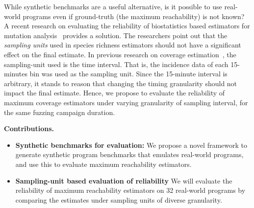 \documentclass[conference]{IEEEtran}
\begin{document}
While synthetic benchmarks are a useful alternative, is it possible to use
real-world programs even if ground-truth (the maximum reachability) is not
known? A recent research on evaluating the reliability of biostatistics based
estimators for mutation analysis~\cite{kuznetsov2024empirical} provides a
solution. The researchers point out that the \emph{sampling units} used in
species richness estimators should not have a significant effect on the final
estimate. In previous research on coverage estimation~\cite{reachability_2023},
the sampling-unit used is the time interval. That is, the incidence data of
each 15-minutes bin was used as the sampling unit. Since the 15-minute interval
is arbitrary, it stands to reason that changing the timing granularity should
not impact the final estimate. Hence, we propose to evaluate the reliability of
maximum coverage estimators under varying granularity of sampling interval,
for the same fuzzing campaign duration.



\noindent{}\textbf{Contributions.}

\begin{itemize}
  \item \textbf{Synthetic benchmarks for evaluation:} We propose a novel
framework to generate synthetic program benchmarks that emulates real-world
programs, and use this to evaluate maximum reachability estimators.

  \item \textbf{Sampling-unit based evaluation of reliability} We will evaluate
    the reliability of maximum reachability estimators on 32 real-world programs
    by comparing the estimates under sampling units of diverse granularity.

    

\end{itemize}
\end{document}
